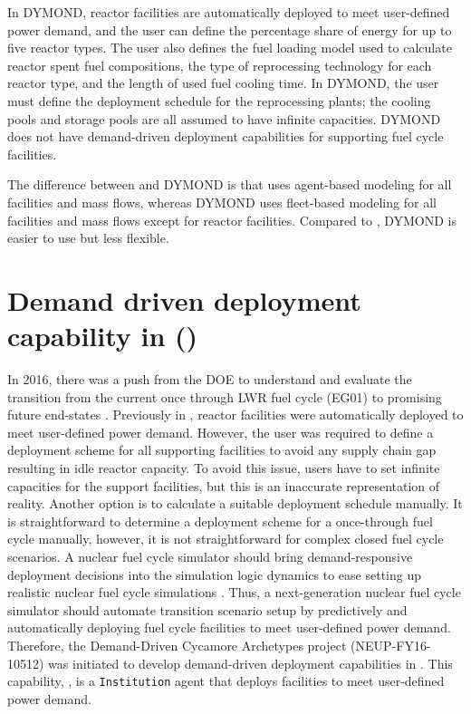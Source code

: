 In DYMOND, reactor facilities are automatically deployed to 
meet user-defined power demand, and the user can define 
the percentage share of energy for up to five reactor types. 
The user also defines the fuel loading model used to calculate 
reactor spent fuel compositions, the type of reprocessing 
technology for each reactor type, and the length 
of used fuel cooling time. 
In DYMOND, the user must define the deployment schedule for 
the reprocessing plants; the cooling pools and storage pools 
are all assumed to have infinite capacities. 
DYMOND does not have demand-driven deployment capabilities for 
supporting fuel cycle facilities. 

The difference between \Cyclus and DYMOND is that \Cyclus uses 
agent-based modeling for all facilities and mass flows, 
whereas DYMOND uses fleet-based modeling for all facilities and 
mass flows except for reactor facilities. 
Compared to \Cyclus, DYMOND is easier to use but less flexible. 

\section{Demand driven deployment capability in \Cyclus (\deploy)}
In 2016, there was a push from the DOE to understand and evaluate the 
transition from the current once through LWR fuel cycle (EG01) 
to promising future end-states \cite{feng_standardized_2016}.
Previously in \Cyclus, reactor facilities were automatically 
deployed to meet user-defined power demand. 
However, the user was required to define a deployment scheme for all 
supporting facilities to avoid any supply chain 
gap resulting in idle reactor capacity. 
To avoid this issue, users 
have to set infinite capacities for the support facilities, 
but this is an inaccurate representation of reality. 
Another option is to calculate a suitable deployment schedule manually.
It is straightforward to determine a deployment scheme for a once-through 
fuel cycle manually, however, it is not straightforward for complex 
closed fuel cycle scenarios.
A nuclear fuel cycle simulator should bring demand-responsive deployment decisions into 
the simulation logic dynamics to ease setting up realistic nuclear fuel cycle 
simulations \cite{huff_current_2017}. 
Thus, a next-generation nuclear fuel cycle simulator should automate 
transition scenario setup by predictively and 
automatically deploying fuel cycle facilities to meet user-defined 
power demand. 
Therefore, the Demand-Driven Cycamore Archetypes project
(NEUP-FY16-10512) was initiated to develop demand-driven deployment 
capabilities in \Cyclus.
This capability, \deploy, is a \Cyclus \texttt{Institution}
agent that deploys facilities to meet user-defined power demand. 

